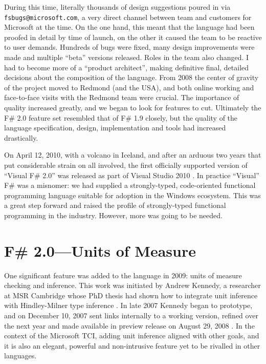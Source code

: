 \documentclass[acmsmall,screen]{acmart}
\begin{document}
During this time, literally thousands of design suggestions poured in via \texttt{fsbugs@microsoft.com}, a very direct channel between team and
customers for Microsoft at the time. On the one hand, this meant that the language had been proofed in detail by time of launch, on the
other it caused the team to be reactive to user demands.  Hundreds of bugs were fixed, many design improvements were made and
multiple “beta” versions released.  Roles in the team also changed.  I had to become more of a “product architect”, making
definitive final, detailed decisions about the composition of the language.  From 2008 the center of gravity of the project moved to
Redmond (and the USA), and both online working and face-to-face visits with the Redmond team were crucial.  The importance of
quality increased greatly, and we began to look for features to cut.  Ultimately the F\# 2.0 feature set resembled that of F\# 1.9 closely,
but the quality of the language specification, design, implementation and tools had increased drastically.

On April 12, 2010, with a volcano in Iceland, and after an arduous two years that put considerable strain on all involved, the first officially
supported version of “Visual F\# 2.0” was released as part of Visual Studio
2010 \citep{RefFSharpDay}.
In practice “Visual” F\# was a misnomer: we had supplied a strongly-typed, code-oriented functional programming language
suitable for adoption in the Windows ecosystem.  This was a great step forward and raised the profile of strongly-typed functional
programming in the industry. However, more was going to be needed. 



\section*{F\# 2.0---Units of Measure }

One significant feature was added to the language in 2009: units of measure checking and inference.  This
work was initiated by Andrew Kennedy, a researcher at MSR Cambridge whose PhD thesis had shown how to integrate
unit inference with Hindley-Milner type inference \citep{Kennedy1995}. In late 2007 Kennedy began to prototype, and on
December 10, 2007 sent links internally to a working version, refined over the next year and made available in preview
release on August 29, 2008 \citep{Ref2088CTP}.
In the context of the Microsoft TCI, adding unit inference aligned with other goals, and it
is also an elegant, powerful and non-intrusive feature yet to be rivalled in other languages.
\end{document}
